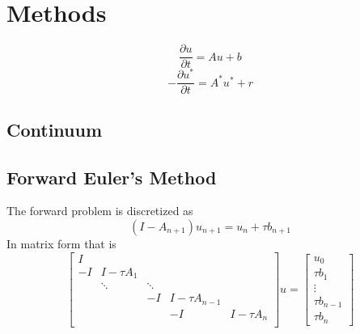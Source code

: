 \documentclass[12pt]{article}
\begin{document}
\maketitle
\section{Methods}
\begin{equation}\label{ForwardProblem}
\frac{\partial u}{\partial t} = A u + b
\end{equation}
\begin{equation}\label{AdjointProblem}
-\frac{\partial u^*}{\partial t} = A^* u^* + r
\end{equation}
\subsection{Continuum}
\subsection{Forward Euler's Method}
The forward problem is discretized as
\begin{equation}\label{FEulerDiscrete}
(I-A_{n+1})u_{n+1} = u_n + \tau b_{n+1}
\end{equation}
In matrix form that is
\begin{equation}
\begin{bmatrix}
I\\
-I & I - \tau A_1\\
& \ddots & \ddots\\
& & -I & I - \tau A_{n-1}\\
& & & -I & I - \tau A_{n}\\
\end{bmatrix}
u = 
\begin{bmatrix}
u_0 \\
\tau b_1 \\
\vdots \\
\tau b_{n-1} \\
\tau b_n
\end{bmatrix}
\end{equation}
\end{document}

